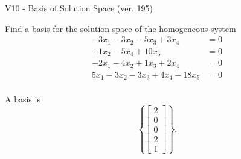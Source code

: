 \begin{exercise}
  \begin{exerciseTitle}V10 - Basis of Solution Space (ver. 195)\end{exerciseTitle}
  \begin{exerciseStatement}
    Find a basis for the solution space of the homogeneous system 
\begin{align*}
 -3 x_ 1 -3 x_ 2 -5 x_ 3 + 3 x_ 4 &= 0  \\ 
  + 1 x_ 2 -5 x_ 4 + 10 x_ 5 &= 0  \\ 
  -2 x_ 1 -4 x_ 2 + 1 x_ 3 + 2 x_ 4 &= 0  \\ 
  5 x_ 1 -3 x_ 2 -3 x_ 3 + 4 x_ 4 -18 x_ 5 &= 0  \\ 
 \end{align*}


 
  \end{exerciseStatement}

  \begin{exerciseAnswer}
   A basis is   
\[\left\{\left[\begin{array}{c}
2 \\
0 \\
0 \\
2 \\
1
\end{array}\right]\right\}.\]

  


  \end{exerciseAnswer}
\end{exercise}